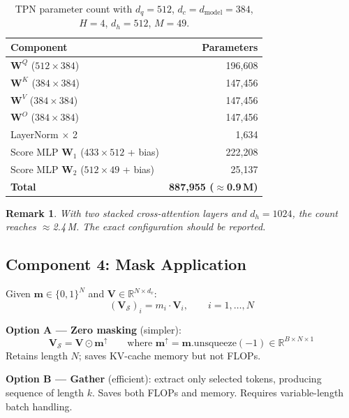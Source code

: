 \documentclass[11pt,a4paper]{article}
\newcommand{\R}{\mathbb{R}}
\newcommand{\vm}{\mathbf{m}}
\newcommand{\mV}{\mathbf{V}}
\newtheorem{remark}{Remark}
\begin{document}
\begin{table}[h]
\centering
\caption{TPN parameter count with $d_q{=}512$, $d_c{=}d_{\text{model}}{=}384$,
$H{=}4$, $d_h{=}512$, $M{=}49$.}
\label{tab:tpn_params}
\renewcommand{\arraystretch}{1.15}
\small
\begin{tabular}{@{}lr@{}}
  \toprule
  Component & Parameters \\
  \midrule
  $\mathbf{W}^Q$ ($512 \times 384$) & 196{,}608 \\
  $\mathbf{W}^K$ ($384 \times 384$) & 147{,}456 \\
  $\mathbf{W}^V$ ($384 \times 384$) & 147{,}456 \\
  $\mathbf{W}^O$ ($384 \times 384$) & 147{,}456 \\
  LayerNorm $\times$ 2 & 1{,}634 \\
  Score MLP $\mathbf{W}_1$ ($433 \times 512$ + bias) & 222{,}208 \\
  Score MLP $\mathbf{W}_2$ ($512 \times 49$ + bias) & 25{,}137 \\
  \midrule
  \textbf{Total} & \textbf{887{,}955 ($\approx$0.9\,M)} \\
  \bottomrule
\end{tabular}
\end{table}

\begin{remark}
With two stacked cross-attention layers and $d_h = 1024$, the count
reaches $\approx$2.4\,M. The exact configuration should be reported.
\end{remark}

\subsection{Component 4: Mask Application}

Given $\vm \in \{0,1\}^N$ and $\mV \in \R^{N \times d_v}$:
\begin{equation}
  (\mV_{\mathcal{S}})_i = m_i \cdot \mV_i,
    \qquad i = 1, \ldots, N
  \label{eq:masking}
\end{equation}

\textbf{Option A --- Zero masking} (simpler):
\begin{equation}
  \mV_{\mathcal{S}} = \mV \odot \vm^{\uparrow}
  \qquad \text{where } \vm^{\uparrow} = \vm.\text{unsqueeze}(-1)
    \in \R^{B \times N \times 1}
\end{equation}
Retains length $N$; saves KV-cache memory but not FLOPs.

\textbf{Option B --- Gather} (efficient):
extract only selected tokens, producing sequence of length $k$.
Saves both FLOPs and memory. Requires variable-length batch handling.
\end{document}
